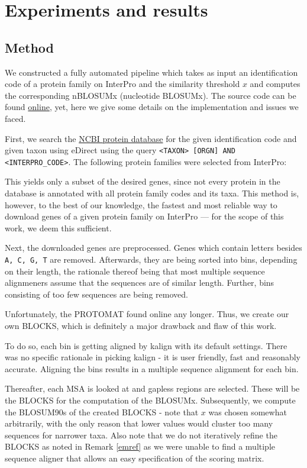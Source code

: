 \documentclass{article}
\begin{document}
\section{Experiments and results}
\subsection{Method}
We constructed a fully automated pipeline which takes as input an identification code of a protein
family on InterPro and the similarity threshold $x$ and computes the
corresponding nBLOSUMx (nucleotide BLOSUMx). The source code can be found \href{https://github.com/tmpr/bac-thesis}{online}, yet, here we
give some details on the implementation and issues we faced.

First, we search the \href{https://www.ncbi.nlm.nih.gov/protein}{NCBI protein
database} for the given identification code and given taxon using eDirect
using the query \texttt{<TAXON> [ORGN] AND <INTERPRO\_CODE>}.
The following protein families were selected from InterPro:
 
This yields only a subset of the desired genes, since not every
protein in the database is annotated with all protein family codes and its taxa. This method is,
however, to the best of our knowledge, the fastest and most reliable way to
download genes of a given protein family on InterPro --- for the scope of this
work, we deem this sufficient.

Next, the downloaded genes are preprocessed. Genes which contain letters 
besides \texttt{A, C, G, T} are removed. Afterwards, they are being sorted into bins,
depending on their length, the rationale thereof being that most multiple
sequence alignmeners assume that the sequences are of similar length. Further,
bins consisting of too few sequences are being removed.

Unfortunately, the PROTOMAT \cite{henikoffAutomatedAssemblyProtein1991} found online any longer. 
Thus, we create our own BLOCKS, which is definitely a major drawback and flaw of this work. 

To do so, each bin is getting aligned by kalign \cite{lassmannKalignAccurateFast2005} with
its default settings. There was no specific rationale in picking kalign - it is
user friendly, fast and reasonably accurate. Aligning the bins results
in a multiple sequence alignment for each bin.

Thereafter, each MSA is looked at and gapless regions are selected. 
These will be the BLOCKS for the computation of the BLOSUMx.
Subsequently, we compute the BLOSUM90s of the created BLOCKS - note that $x$
was chosen somewhat arbitrarily, with the only reason that lower values would
cluster too many sequences for narrower taxa. Also note
that we do not iteratively refine the BLOCKS as noted in Remark \ref{emref}
as we were unable to find a multiple sequence aligner that allows an easy specification
of the scoring matrix.
\end{document}
